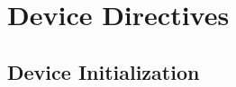 %
%
%
%
%
%
%
%
%
%
%
%
%


\section{Device Directives}
\label{sec:Device Directives}

\subsection{Device Initialization}
\label{subsec:Device Initialization}


